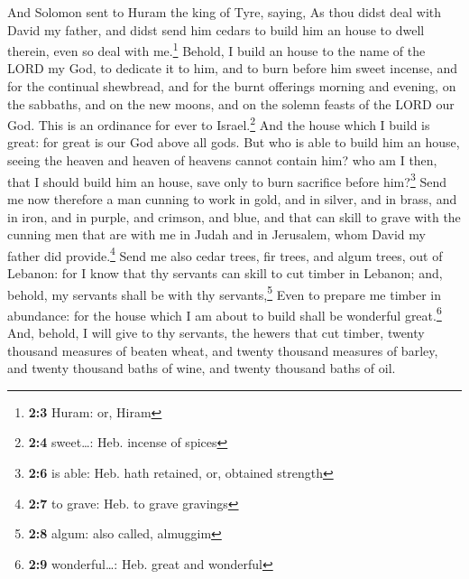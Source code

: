  And Solomon sent to Huram the king of Tyre, saying, As
thou didst deal with David my father, and didst send him cedars to build
him an house to dwell therein, even so deal with me.\footnote{\textbf{2:3}
  Huram: or, Hiram}  Behold, I build an house to the name
of the LORD my God, to dedicate it to him, and to burn before him sweet
incense, and for the continual shewbread, and for the burnt offerings
morning and evening, on the sabbaths, and on the new moons, and on the
solemn feasts of the LORD our God. This is an ordinance for ever to
Israel.\footnote{\textbf{2:4} sweet\ldots: Heb. incense of spices}
 And the house which I build is great: for great is our
God above all gods.  But who is able to build him an
house, seeing the heaven and heaven of heavens cannot contain him? who
am I then, that I should build him an house, save only to burn sacrifice
before him?\footnote{\textbf{2:6} is able: Heb. hath retained, or,
  obtained strength}  Send me now therefore a man cunning
to work in gold, and in silver, and in brass, and in iron, and in
purple, and crimson, and blue, and that can skill to grave with the
cunning men that are with me in Judah and in Jerusalem, whom David my
father did provide.\footnote{\textbf{2:7} to grave: Heb. to grave
  gravings}  Send me also cedar trees, fir trees, and
algum trees, out of Lebanon: for I know that thy servants can skill to
cut timber in Lebanon; and, behold, my servants shall be with thy
servants,\footnote{\textbf{2:8} algum: also called, almuggim}
 Even to prepare me timber in abundance: for the house
which I am about to build shall be wonderful great.\footnote{\textbf{2:9}
  wonderful\ldots: Heb. great and wonderful}  And,
behold, I will give to thy servants, the hewers that cut timber, twenty
thousand measures of beaten wheat, and twenty thousand measures of
barley, and twenty thousand baths of wine, and twenty thousand baths of
oil.

